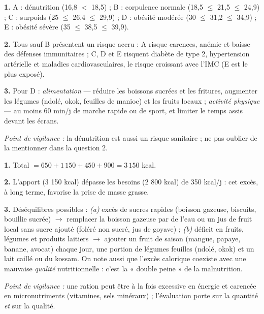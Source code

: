 \documentclass[11pt]{article}
\newcounter{popsec}
\newcounter{popsub}
\newcommand{\courssub}[1]{%
  \stepcounter{popsub}%
  \par\vspace{9pt}\noindent{\popxbold\fontsize{11.5}{13}\selectfont\color{popink}{\color{poporange}\thepopsec.\thepopsub}\hspace{6pt}#1}\par\nopagebreak\vspace{4pt}
}
\begin{document}
\courssub{Je m'entraîne}

\begin{corrige}
\textbf{1.} A : dénutrition (16,8 $<$ 18,5) ; B : corpulence normale (18,5 $\leq$ 21,5 $\leq$ 24,9) ; C : surpoids (25 $\leq$ 26,4 $\leq$ 29,9) ; D : obésité modérée (30 $\leq$ 31,2 $\leq$ 34,9) ; E : obésité sévère (35 $\leq$ 38,5 $\leq$ 39,9).

\textbf{2.} Tous sauf B présentent un risque accru : A risque carences, anémie et baisse des défenses immunitaires ; C, D et E risquent diabète de type 2, hypertension artérielle et maladies cardiovasculaires, le risque croissant avec l'IMC (E est le plus exposé).

\textbf{3.} Pour D : \emph{alimentation} --- réduire les boissons sucrées et les fritures, augmenter les légumes (ndolé, okok, feuilles de manioc) et les fruits locaux ; \emph{activité physique} --- au moins 60 min/j de marche rapide ou de sport, et limiter le temps assis devant les écrans.

\emph{Point de vigilance :} la dénutrition est aussi un risque sanitaire ; ne pas oublier de la mentionner dans la question 2.
\end{corrige}

\begin{corrige}
\textbf{1.} Total $= 650 + 1\,150 + 450 + 900 = 3\,150$ kcal.

\textbf{2.} L'apport (3 150 kcal) dépasse les besoins (2 800 kcal) de 350 kcal/j : cet excès, à long terme, favorise la prise de masse grasse.

\textbf{3.} Déséquilibres possibles : \emph{(a)} excès de sucres rapides (boisson gazeuse, biscuits, bouillie sucrée) $\to$ remplacer la boisson gazeuse par de l'eau ou un jus de fruit local sans sucre ajouté (foléré non sucré, jus de goyave) ; \emph{(b)} déficit en fruits, légumes et produits laitiers $\to$ ajouter un fruit de saison (mangue, papaye, banane, avocat) chaque jour, une portion de légumes feuilles (ndolé, okok) et un lait caillé ou du kossam. On note aussi que l'excès calorique coexiste avec une mauvaise \emph{qualité} nutritionnelle : c'est la « double peine » de la malnutrition.

\emph{Point de vigilance :} une ration peut être à la fois excessive en énergie et carencée en micronutriments (vitamines, sels minéraux) ; l'évaluation porte sur la quantité \emph{et} sur la qualité.
\end{corrige}
\end{document}
